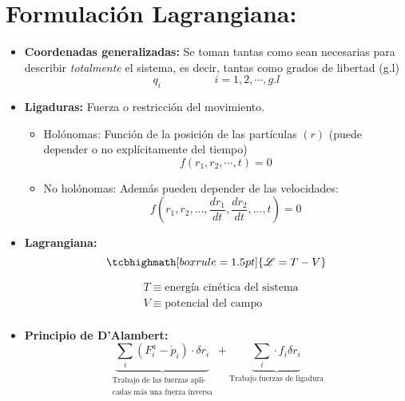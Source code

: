 \documentclass[14pt]{extarticle}
\newcommand{\Lagr}{\mathscr{L}}
\begin{document}
	\section{Formulación Lagrangiana:}
		\begin{itemize}
		\item{ \textbf{Coordenadas generalizadas:} 
			Se toman tantas como sean necesarias para describir \textit{totalmente} el sistema, es decir, tantas como grados de libertad (g.l)
			\begin{equation}
				q_i \hspace{2cm} i=1,2, \cdots, g.l
			\end{equation}
		}
		\item{ \textbf{Ligaduras:} 
			Fuerza o restricción del movimiento.
				\begin{itemize}
					\item{ Holónomas: Función de la posición de las partículas $(r)$ (puede depender o no explícitamente del tiempo)
						\begin{equation}
							f(r_1, r_2, \cdots, t) = 0
						\end{equation}
					}
					\item{ No holónomas: Además pueden depender de las velocidades: 
						\begin{equation}
							f(r_1, r_2, ..., \frac{dr_1}{dt}, \frac{dr_2}{dt}, ..., t) = 0
						\end{equation}
					}
				\end{itemize}
		}
		\item{ \textbf{Lagrangiana:}
			\begin{equation}
				\tcbhighmath[boxrule=1.5pt]{\Lagr = T - V}
			\end{equation}

			\begin{equation*}
				\begin{split}
					&T \equiv \text{energía cinética del sistema}\\
					&V \equiv \text{potencial del campo}\\
				\end{split}
			\end{equation*}
		}
		\item{ \textbf{Principio de D'Alambert:} 
			\begin{equation}
				\underbrace{\sum_i \left( F^{a}_i - \dot{p}_i \right) \cdot \delta r_i}_{\substack{\text{Trabajo de las fuerzas apli-} \\ \text{cadas más una fuerza inversa}}} + \underbrace{\sum_i \cdot f_i \delta r_i}_{\text{Trabajo fuerzas de ligadura}}
			\end{equation}

}
\end{itemize}
\end{document}
